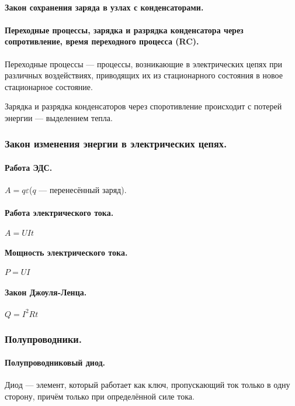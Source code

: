 \documentclass{article}
\begin{document}
            \paragraph{Закон сохранения заряда в узлах с конденсаторами.}
            \paragraph{Переходные процессы, зарядка и разрядка конденсатора через сопротивление, время переходного процесса (RC).}
                Переходные процессы — процессы, возникающие в электрических цепях при различных воздействиях, приводящих их из стационарного состояния в новое стационарное состояние.

                Зарядка и разрядка конденсаторов через споротивление происходит с потерей энергии --- выделением тепла.

        \subsubsection{Закон изменения энергии в электрических цепях.}
            \paragraph{Работа ЭДС.}
                \(A = q\varepsilon\)(\(q\) --- перенесённый заряд).
            \paragraph{Работа электрического тока.}
                \(A = UIt\)
            \paragraph{Мощность электрического тока.}
                \(P = UI\)
            \paragraph{Закон Джоуля-Ленца.}
                \(Q = I^2Rt\)
        \subsubsection{Полупроводники.}
            \paragraph{Полупроводниковый диод.}
                Диод --- элемент, который работает как ключ, пропускающий ток только в одну сторону, причём только при определённой силе тока.
\end{document}
